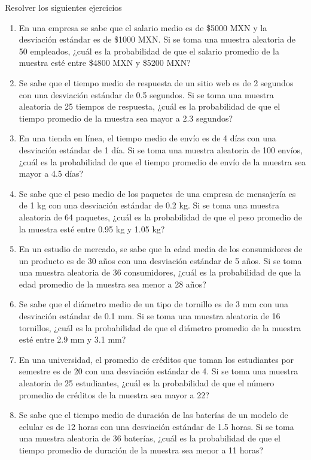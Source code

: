 \begin{Ejer}  Resolver los siguientes ejercicios

\begin{enumerate}
    \item En una empresa se sabe que el salario medio es de \$5000 MXN y la desviación estándar es de \$1000 MXN. Si se toma una muestra aleatoria de 50 empleados, ¿cuál es la probabilidad de que el salario promedio de la muestra esté entre \$4800 MXN y \$5200 MXN?
    \item Se sabe que el tiempo medio de respuesta de un sitio web es de 2 segundos con una desviación estándar de 0.5 segundos. Si se toma una muestra aleatoria de 25 tiempos de respuesta, ¿cuál es la probabilidad de que el tiempo promedio de la muestra sea mayor a 2.3 segundos?
    \item En una tienda en línea, el tiempo medio de envío es de 4 días con una desviación estándar de 1 día. Si se toma una muestra aleatoria de 100 envíos, ¿cuál es la probabilidad de que el tiempo promedio de envío de la muestra sea mayor a 4.5 días?
    \item Se sabe que el peso medio de los paquetes de una empresa de mensajería es de 1 kg con una desviación estándar de 0.2 kg. Si se toma una muestra aleatoria de 64 paquetes, ¿cuál es la probabilidad de que el peso promedio de la muestra esté entre 0.95 kg y 1.05 kg?
    \item En un estudio de mercado, se sabe que la edad media de los consumidores de un producto es de 30 años con una desviación estándar de 5 años. Si se toma una muestra aleatoria de 36 consumidores, ¿cuál es la probabilidad de que la edad promedio de la muestra sea menor a 28 años?
    \item Se sabe que el diámetro medio de un tipo de tornillo es de 3 mm con una desviación estándar de 0.1 mm. Si se toma una muestra aleatoria de 16 tornillos, ¿cuál es la probabilidad de que el diámetro promedio de la muestra esté entre 2.9 mm y 3.1 mm?
    \item En una universidad, el promedio de créditos que toman los estudiantes por semestre es de 20 con una desviación estándar de 4. Si se toma una muestra aleatoria de 25 estudiantes, ¿cuál es la probabilidad de que el número promedio de créditos de la muestra sea mayor a 22?
    \item Se sabe que el tiempo medio de duración de las baterías de un modelo de celular es de 12 horas con una desviación estándar de 1.5 horas. Si se toma una muestra aleatoria de 36 baterías, ¿cuál es la probabilidad de que el tiempo promedio de duración de la muestra sea menor a 11 horas?

\end{enumerate}
\end{Ejer}
